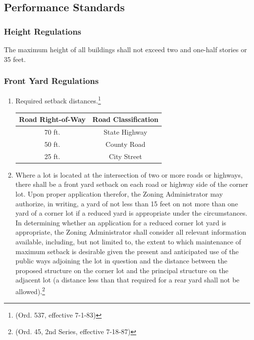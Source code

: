 \subsection{Performance Standards}
\subsubsection{Height Regulations}
The maximum height of all buildings shall not exceed two and one-half stories or 35 feet.
\subsubsection{Front Yard Regulations}
\begin{enumerate}[{\indent}a)]
    \item Required setback distances.\footnote{(Ord. 537, effective 7-1-83)}        
        \begin{center}
        \begin{tabular}{|c|c|}
            \hline
            \textbf{Road Right-of-Way} & \textbf{Road Classification}\\
            \hline
            70 ft. & State Highway\\
            \hline
            50 ft. & County Road\\
            \hline
            25 ft. & City Street\\
            \hline
        \end{tabular}
        \end{center}
    \item Where a lot is located at the intersection of two or more roads or highways, there shall be a front yard setback on each road or highway side of the corner lot. Upon proper application therefor, the Zoning Administrator may authorize, in writing, a yard of not less than 15 feet on not more than one yard of a corner lot if a reduced yard is appropriate under the circumstances. In determining whether an application for a reduced corner lot yard is appropriate, the Zoning Administrator shall consider all relevant information available, including, but not limited to, the extent to which maintenance of maximum setback is desirable given the present and anticipated use of the public ways adjoining the lot in question and the distance between the proposed structure on the corner lot and the principal structure on the adjacent lot (a distance less than that required for a rear yard shall not be allowed).\footnote{(Ord. 45, 2nd Series, effective 7-18-87)}
\end{enumerate}
